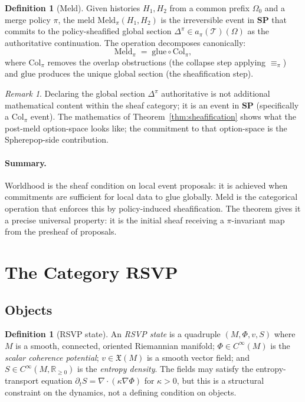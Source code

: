\documentclass[12pt,a4paper]{article}
\theoremstyle{definition}
\newtheorem{definition}[theorem]{Definition}
\theoremstyle{remark}
\newtheorem{remark}[theorem]{Remark}
\newcommand{\Rnn}{\mathbb{R}_{\ge 0}}
\newcommand{\SP}{\mathbf{SP}}
\newcommand{\RSVP}{\mathbf{RSVP}}
\newcommand{\Col}{\mathrm{Col}}
\newcommand{\Meld}{\mathrm{Meld}}
\newcommand{\PhiF}{\Phi}
\newcommand{\vF}{v}
\newcommand{\SF}{S}
\begin{document}
\begin{definition}[Meld]
\label{def:meld}
Given histories $H_1,H_2$ from a common prefix $\Omega_0$ and a merge policy $\pi$,
the meld $\Meld_\pi(H_1,H_2)$ is the irreversible event in $\SP$ that commits to
the policy-sheafified global section $\Delta^\pi\in a_\pi(\mathcal{T})(\Omega)$ as
the authoritative continuation. The operation decomposes canonically:
\[
  \Meld_\pi \;=\; \mathrm{glue}\circ\Col_\pi,
\]
where $\Col_\pi$ removes the overlap obstructions (the collapse step applying
$\equiv_\pi$) and $\mathrm{glue}$ produces the unique global section
(the sheafification step).
\end{definition}

\begin{remark}
Declaring the global section $\Delta^\pi$ authoritative is not additional mathematical
content within the sheaf category; it is an event in $\SP$ (specifically a $\Col_\pi$
event). The mathematics of Theorem~\ref{thm:sheafification} shows what the
post-meld option-space looks like; the commitment to that option-space is the Spherepop-side
contribution.
\end{remark}

\paragraph{Summary.} Worldhood is the sheaf condition on local event proposals: it is
achieved when commitments are sufficient for local data to glue globally. Meld is the
categorical operation that enforces this by policy-induced sheafification. The theorem
gives it a precise universal property: it is the initial sheaf receiving a $\pi$-invariant
map from the presheaf of proposals.

\section{The Category \texorpdfstring{$\RSVP$}{RSVP}}
\label{sec:rsvp}

\subsection{Objects}

\begin{definition}[RSVP state]
\label{def:rsvp-state}
An \emph{RSVP state} is a quadruple $(M,\PhiF,\vF,\SF)$ where $M$ is a smooth,
connected, oriented Riemannian manifold; $\PhiF\in C^\infty(M)$ is the \emph{scalar
coherence potential}; $\vF\in\mathfrak{X}(M)$ is a smooth vector field; and
$\SF\in C^\infty(M,\Rnn)$ is the \emph{entropy density}. The fields may satisfy
the entropy-transport equation $\partial_t\SF=\nabla\cdot(\kappa\nabla\PhiF)$ for
$\kappa>0$, but this is a structural constraint on the dynamics, not a defining
condition on objects.
\end{definition}
\end{document}
